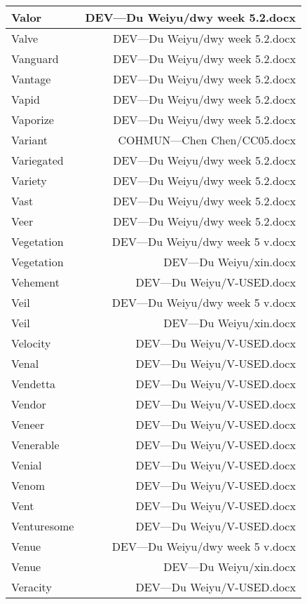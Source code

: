 \documentclass{article}
\begin{document}
\begin{center}
\begin{longtable}{|l|r|}
\hline
Valor  &  DEV---Du Weiyu/dwy week 5.2.docx\\  
\hline
Valve  &  DEV---Du Weiyu/dwy week 5.2.docx\\  
\hline
Vanguard  &  DEV---Du Weiyu/dwy week 5.2.docx\\  
\hline
Vantage  &  DEV---Du Weiyu/dwy week 5.2.docx\\  
\hline
Vapid  &  DEV---Du Weiyu/dwy week 5.2.docx\\  
\hline
Vaporize  &  DEV---Du Weiyu/dwy week 5.2.docx\\  
\hline
Variant  &  COHMUN---Chen Chen/CC05.docx\\  
\hline
Variegated  &  DEV---Du Weiyu/dwy week 5.2.docx\\  
\hline
Variety  &  DEV---Du Weiyu/dwy week 5.2.docx\\  
\hline
Vast  &  DEV---Du Weiyu/dwy week 5.2.docx\\  
\hline
Veer  &  DEV---Du Weiyu/dwy week 5.2.docx\\  
\hline
Vegetation  &  DEV---Du Weiyu/dwy week 5 v.docx\\  
\hline
Vegetation  &  DEV---Du Weiyu/xin.docx\\  
\hline
Vehement  &  DEV---Du Weiyu/V-USED.docx\\  
\hline
Veil  &  DEV---Du Weiyu/dwy week 5 v.docx\\  
\hline
Veil  &  DEV---Du Weiyu/xin.docx\\  
\hline
Velocity  &  DEV---Du Weiyu/V-USED.docx\\  
\hline
Venal  &  DEV---Du Weiyu/V-USED.docx\\  
\hline
Vendetta  &  DEV---Du Weiyu/V-USED.docx\\  
\hline
Vendor  &  DEV---Du Weiyu/V-USED.docx\\  
\hline
Veneer  &  DEV---Du Weiyu/V-USED.docx\\  
\hline
Venerable  &  DEV---Du Weiyu/V-USED.docx\\  
\hline
Venial  &  DEV---Du Weiyu/V-USED.docx\\  
\hline
Venom  &  DEV---Du Weiyu/V-USED.docx\\  
\hline
Vent  &  DEV---Du Weiyu/V-USED.docx\\  
\hline
Venturesome  &  DEV---Du Weiyu/V-USED.docx\\  
\hline
Venue  &  DEV---Du Weiyu/dwy week 5 v.docx\\  
\hline
Venue  &  DEV---Du Weiyu/xin.docx\\  
\hline
Veracity  &  DEV---Du Weiyu/V-USED.docx\\  

\end{longtable}
\end{center}
\end{document}
